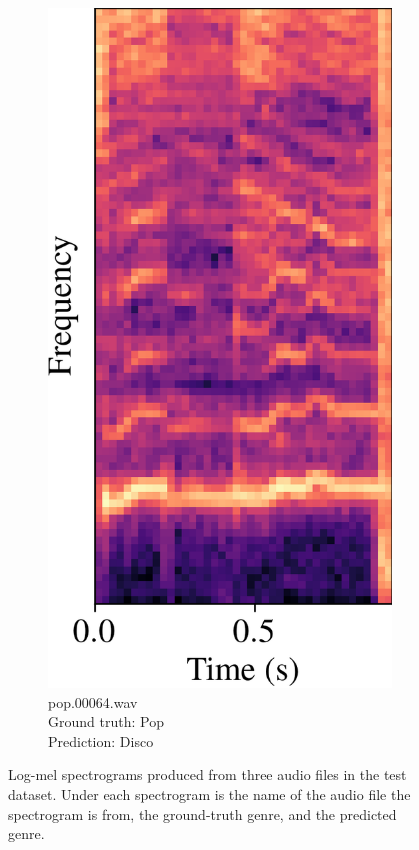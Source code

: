 \documentclass[conference]{IEEEtran}
\begin{document}
\begin{figure}[htbp]
\begin{subfigure}[b]{0.32\columnwidth}
        \label{spec_incorrect_1}
    \end{subfigure}
    \hfill
    \begin{subfigure}[b]{0.32\columnwidth}
        \centerline{\includegraphics[width=\columnwidth]{spec_incorrect_2.png}}
        \caption{pop.00064.wav\\Ground truth: Pop\\Prediction: Disco}
        \label{spec_incorrect_2}
    \end{subfigure}
    \caption{
        Log-mel spectrograms produced from three audio files in the test dataset.
        Under each spectrogram is the name of the audio file the spectrogram is from, the ground-truth genre, and the predicted genre.
    }
    \label{spectrograms}
\end{figure}
\end{document}
